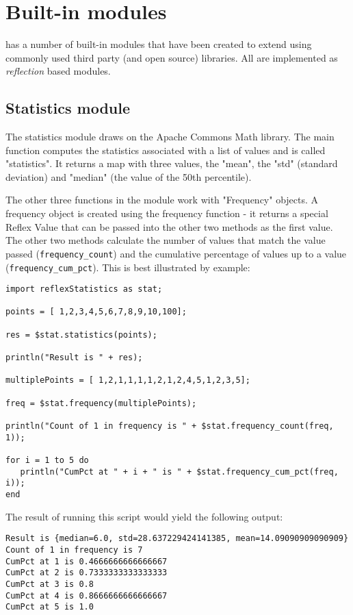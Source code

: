 \chapter{Built-in modules}
\Reflex has a number of built-in modules that have been created to extend \Reflex using commonly used third party (and open source) libraries. All are implemented as \emph{reflection} based modules.
\section{Statistics module}
The statistics module draws on the Apache Commons Math library. The main function computes the statistics associated with a list of values and is called "statistics". It returns a map with three values, the "mean", the "std" (standard deviation) and "median" (the value of the 50th percentile).

The other three functions in the module work with "Frequency" objects. A frequency object is created using the frequency function - it returns a special Reflex Value that can be passed into the other two methods as the first value. The other two methods calculate the number of values that match the value passed (\Verb+frequency_count+) and the cumulative percentage of values up to a value (\verb+frequency_cum_pct+). This is best illustrated by example:

\begin{lstlisting}[caption={Statistics}]
import reflexStatistics as stat;

points = [ 1,2,3,4,5,6,7,8,9,10,100];

res = $stat.statistics(points);

println("Result is " + res);

multiplePoints = [ 1,2,1,1,1,1,2,1,2,4,5,1,2,3,5];

freq = $stat.frequency(multiplePoints);

println("Count of 1 in frequency is " + $stat.frequency_count(freq, 1));

for i = 1 to 5 do
   println("CumPct at " + i + " is " + $stat.frequency_cum_pct(freq, i));
end

\end{lstlisting}
 The result of running this script would yield the following output:
\begin{Verbatim}
Result is {median=6.0, std=28.637229424141385, mean=14.09090909090909}
Count of 1 in frequency is 7
CumPct at 1 is 0.4666666666666667
CumPct at 2 is 0.7333333333333333
CumPct at 3 is 0.8
CumPct at 4 is 0.8666666666666667
CumPct at 5 is 1.0
\end{Verbatim}
